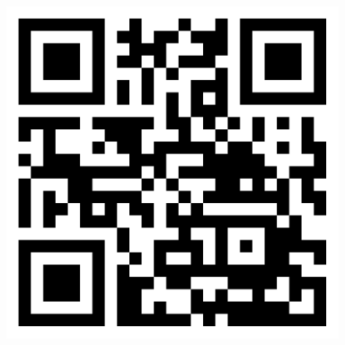 \documentclass[margin,line]{resume}
\begin{document}
\begin{resume}



\end{resume}

\begin{figure}[b]
\hfill \href{http://www.steve-steele.com}{\includegraphics[scale=2.0]{qr}}
\end{figure}
\end{document}
